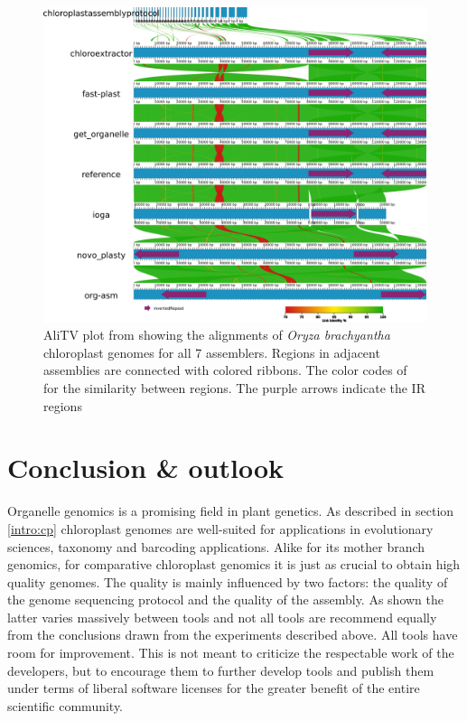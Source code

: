 \begin{figure}[H]
  \centering \includegraphics[height=.60\textheight, width=.99\textwidth]{Figures/AliTV.png} \decoRule
\caption[AliTV plot of alignments of assemblies of \textit{Oryza brachyantha} of all assemblers]{ AliTV plot
  \cite{alitv} from \cite{freudenthal2019landscape} showing the alignments of \textit{Oryza brachyantha}
  chloroplast genomes for all 7 assemblers. Regions in adjacent assemblies are connected with colored ribbons. The color codes of for the similarity between regions. The purple arrows  indicate the IR regions}
\label{fig:alitv}
\end{figure}

\section{Conclusion \& outlook}

Organelle genomics is a promising field in plant genetics. As described in section \ref{intro:cp} chloroplast
genomes are well-suited for applications in evolutionary sciences, taxonomy and barcoding applications. Alike
for its mother branch genomics, for comparative chloroplast genomics it is just as crucial to obtain high
quality genomes. The quality is mainly influenced by two factors: the quality of the genome sequencing
protocol and the quality of the assembly. As shown the latter varies massively between tools and not all tools
are recommend equally from the conclusions drawn from the experiments described above. All tools have room for
improvement. This is not meant to criticize the respectable work of the developers, but to encourage them to
further develop tools and publish them under terms of liberal software licenses for the greater benefit of the
entire scientific community.
